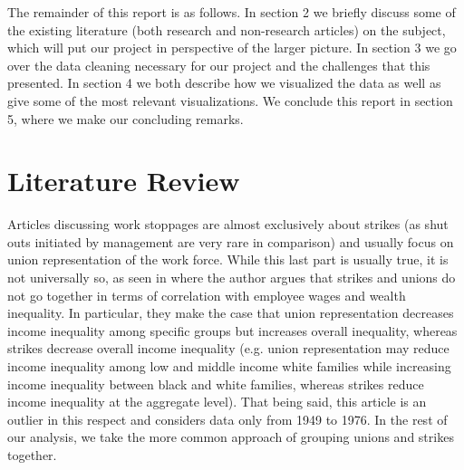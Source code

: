 \documentclass[reqno,11pt]{amsart}
\begin{document}
The remainder of this report is as follows. In section 2 we briefly discuss 
some of the existing literature (both research and non-research articles) on 
the subject, which will put our project in perspective of the larger picture.
In section 3 we go over the data cleaning necessary for our project and the 
challenges that this presented. In section 4 we both describe how we visualized
the data as well as give some of the most relevant visualizations. We conclude
this report in section 5, where we make our concluding remarks.


\section{Literature Review}

Articles discussing work stoppages are almost exclusively about strikes 
(as shut outs initiated by management are very rare in comparison) and 
usually focus on union representation of the work force. While this last part is usually true, it
is not universally so, as seen in \cite{Rubin} where the author argues that 
strikes and unions do not go together in terms of correlation with employee
wages and wealth inequality. In particular, they make the case that 
union representation decreases income inequality among specific groups but 
increases overall inequality, whereas strikes decrease overall income inequality 
(e.g. union representation may reduce income inequality among low and middle 
income white families while increasing income inequality between black and white
families, whereas strikes reduce income inequality at the aggregate level). 
That being said, this article is an outlier in this respect and considers
data only from 1949 to 1976. In the rest of our analysis, we take the more 
common approach of grouping unions and strikes together.
\end{document}
